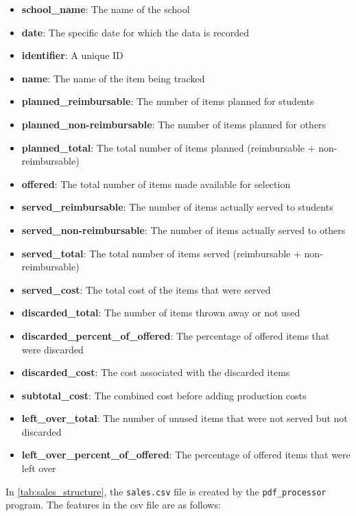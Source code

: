 \documentclass{scrartcl}
\begin{document}
\begin{itemize}
    \item \textbf{school\_name}: The name of the school
    \item \textbf{date}: The specific date for which the data is recorded
    \item \textbf{identifier}: A unique ID
    \item \textbf{name}: The name of the item being tracked
    \item \textbf{planned\_reimbursable}: The number of items planned for students
    \item \textbf{planned\_non-reimbursable}: The number of items planned for others
    \item \textbf{planned\_total}: The total number of items planned (reimbursable + non-reimbursable)
    \item \textbf{offered}: The total number of items made available for selection
    \item \textbf{served\_reimbursable}: The number of items actually served to students
    \item \textbf{served\_non-reimbursable}: The number of items actually served to others
    \item \textbf{served\_total}: The total number of items served (reimbursable + non-reimbursable)
    \item \textbf{served\_cost}: The total cost of the items that were served
    \item \textbf{discarded\_total}: The number of items thrown away or not used
    \item \textbf{discarded\_percent\_of\_offered}: The percentage of offered items that were discarded
    \item \textbf{discarded\_cost}: The cost associated with the discarded items
    \item \textbf{subtotal\_cost}: The combined cost before adding production costs
    \item \textbf{left\_over\_total}: The number of unused items that were not served but not discarded
    \item \textbf{left\_over\_percent\_of\_offered}: The percentage of offered items that were left over
\end{itemize}

In \autoref{tab:sales_structure}, the \texttt{sales.csv} file is created by the \texttt{pdf\_processor} program. The features in the csv file are as follows:
\end{document}
